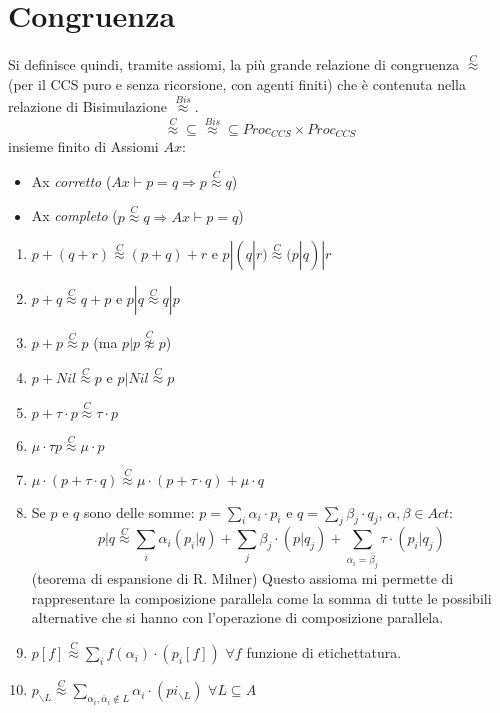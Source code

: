 \section{Congruenza}
Si definisce quindi, tramite assiomi, la più grande relazione di congruenza
$\stackrel{C}{\approx}$ (per il CCS puro e senza ricorsione, con agenti finiti)
che è contenuta nella relazione di Bisimulazione $\stackrel{Bis}{\approx}$.
$$\stackrel{C}{\approx} \subseteq \stackrel{Bis}{\approx} \subseteq Proc_{CCS} \times Proc_{CCS}$$
insieme finito di Assiomi $Ax$:
\begin{itemize}
    \item Ax \textit{corretto} ($Ax \vdash p = q \Rightarrow p \stackrel{C}{\approx} q$)
    \item Ax \textit{completo} ($p \stackrel{C}{\approx} q \Rightarrow Ax \vdash p = q$)
\end{itemize}
\begin{enumerate}
    \item $p + (q + r) \stackrel{C}{\approx} (p + q) + r$ e $p | (q | r) \stackrel{C}{\approx} (p | q) | r$
    \item $p + q \stackrel{C}{\approx} q + p$ e $p | q \stackrel{C}{\approx} q | p$
    \item $p + p \stackrel{C}{\approx} p$ (ma $p | p \stackrel{C}{\not\approx} p$)
    \item $p + Nil \stackrel{C}{\approx} p$ e $p | Nil \stackrel{C}{\approx} p$
    \item $p + \tau \cdot p \stackrel{C}{\approx} \tau \cdot p$
    \item $\mu \cdot \tau p \stackrel{C}{\approx} \mu \cdot p$
    \item $\mu \cdot (p + \tau \cdot q) \stackrel{C}{\approx} \mu \cdot (p + \tau \cdot q) + \mu \cdot q$
    \item Se $p$ e $q$ sono delle somme: $p = \sum_{i} \alpha_i \cdot p_i$ e
          $q = \sum_{j} \beta_j \cdot q_j$,  $\alpha, \beta \in Act$:
          $$p | q \stackrel{C}{\approx} \sum_{i} \alpha_i (p_{i} | q) + \sum_{j} \beta_{j} \cdot (p|q_{j}) + \sum_{\alpha_i = \overline{\beta}_{j}} \tau \cdot (p_{i} | q_{j})$$
          (teorema di espansione di R. Milner) Questo assioma mi permette di rappresentare
          la composizione parallela come la somma di tutte le possibili alternative
          che si hanno con l'operazione di composizione parallela.
    \item $p[f] \stackrel{C}{\approx} \sum_{i} f(\alpha_i) \cdot (p_{i} [f])$ $\forall f$ funzione di etichettatura.
    \item $p_{\backslash L} \stackrel{C}{\approx} \sum_{\alpha_i,\overline{\alpha}_i \not\in L} \alpha_i \cdot (pi_{\backslash L})$ $\forall L \subseteq A$
\end{enumerate}